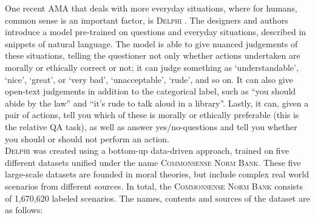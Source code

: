 \documentclass[final]{clv3} %
\begin{document}
One recent AMA that deals with more everyday situations, where for humans, common sense is an important factor, is \textsc{Delphi} \cite{jiang}. The designers and authors introduce a model pre-trained on questions and everyday situations, described in snippets of natural language. The model is able to give nuanced judgements of these situations, telling the questioner not only whether actions undertaken are morally or ethically correct or not; it can judge something as ‘understandable’, ‘nice’, ‘great’, or ‘very bad’, ‘unacceptable’, ‘rude’, and so on. It can also give open-text judgements in addition to the categorical label, such as “you should abide by the law” and “it’s rude to talk aloud in a library”. Lastly, it can, given a pair of actions, tell you which of these is morally or ethically preferable (this is the relative QA task), as well as answer yes/no-questions and tell you whether you should or should not perform an action.\\

\textsc{Delphi} was created using a bottom-up data-driven approach, trained on five different datasets unified under the name \textsc{Commonsense Norm Bank}. These five large-scale datasets are founded in moral theories, but include complex real world scenarios from different sources. In total, the \textsc{Commonsense Norm Bank} consists of 1,670,620 labeled scenarios. The names, contents and sources of the dataset are as follows:
\end{document}
